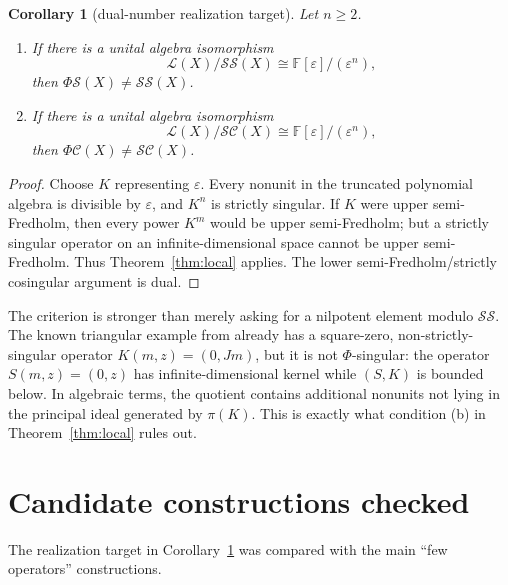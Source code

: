 \documentclass[11pt]{article}
\newtheorem{corollary}[theorem]{Corollary}
\theoremstyle{definition}
\newcommand{\Lop}{\mathcal L}
\newcommand{\SSing}{\mathcal{SS}}
\newcommand{\SCos}{\mathcal{SC}}
\newcommand{\PhiS}{\Phi\mathcal S}
\newcommand{\PhiC}{\Phi\mathcal C}
\newcommand{\F}{\mathbb F}
\begin{document}
\begin{corollary}[dual-number realization target]\label{cor:dualnumbers}
Let \(n\ge2\).
\begin{enumerate}[label=\rm(\roman*)]
\item If there is a unital algebra isomorphism
\[
 \Lop(X)/\SSing(X)\cong \F[\varepsilon]/(\varepsilon^n),
\]
then \(\PhiS(X)\ne\SSing(X)\).
\item If there is a unital algebra isomorphism
\[
 \Lop(X)/\SCos(X)\cong \F[\varepsilon]/(\varepsilon^n),
\]
then \(\PhiC(X)\ne\SCos(X)\).
\end{enumerate}
\end{corollary}

\begin{proof}
Choose \(K\) representing \(\varepsilon\).  Every nonunit in the truncated polynomial
algebra is divisible by \(\varepsilon\), and \(K^n\) is strictly singular.  If \(K\) were
upper semi-Fredholm, then every power \(K^m\) would be upper semi-Fredholm; but a
strictly singular operator on an infinite-dimensional space cannot be upper semi-Fredholm.
Thus Theorem~\ref{thm:local} applies.  The lower semi-Fredholm/strictly cosingular
argument is dual.
\end{proof}

The criterion is stronger than merely asking for a nilpotent element modulo
\(\SSing\).  The known triangular example from \cite[Example~2.3]{Aiena2012} already
has a square-zero, non-strictly-singular operator
\(K(m,z)=(0,Jm)\), but it is not \(\Phi\)-singular: the operator
\(S(m,z)=(0,z)\) has infinite-dimensional kernel while \((S,K)\) is bounded below.  In
algebraic terms, the quotient contains additional nonunits not lying in the principal ideal
generated by \(\pi(K)\).  This is exactly what condition (b) in
Theorem~\ref{thm:local} rules out.

\section{Candidate constructions checked}

The realization target in Corollary~\ref{cor:dualnumbers} was compared with the main
``few operators'' constructions.
\end{document}
